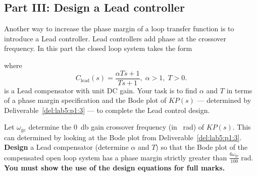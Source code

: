\subsection{Part III: Design a Lead controller}
Another way to increase the phase margin of a loop transfer function is to introduce a Lead controller.
Lead controllers add phase at the crossover frequency.
In this part the closed loop system takes the form
%
\begin{center}
\end{center}
%
where
\[
  C_\mathrm{lead}(s)
    =
      \frac{\alpha T s + 1}{T s + 1}
  ,
  \;
  \alpha > 1
  ,
  \;
  T > 0.
\]
is a Lead compensator with unit DC gain.
Your task is to find \(\alpha\) and \(T\) in terms of a phase margin specification and the Bode plot of \(K P(s)\) --- determined by Deliverable~\ref{del:lab5:p1:3} --- to complete the Lead control design.
%
\begin{deliverable}[label={del:lab5:p3:1}]
  Let \(\omega_\mathrm{gc}\) determine the \SI{0}{\decibel} gain crossover frequency (in \SI{}{\radian}) of \(K P(s).\)
  This can determined by looking at the Bode plot from Deliverable~\ref{del:lab5:p1:3}.
  \textbf{Design} a Lead compensator (determine \(\alpha\) and \(T\)) so that the Bode plot of the compensated open loop system has a phase margin strictly greater than \(\frac{6\omega_\mathrm{gc}}{100}~\mathrm{rad}.\)
  \textbf{You must show the use of the design equations for full marks.}
\end{deliverable}
